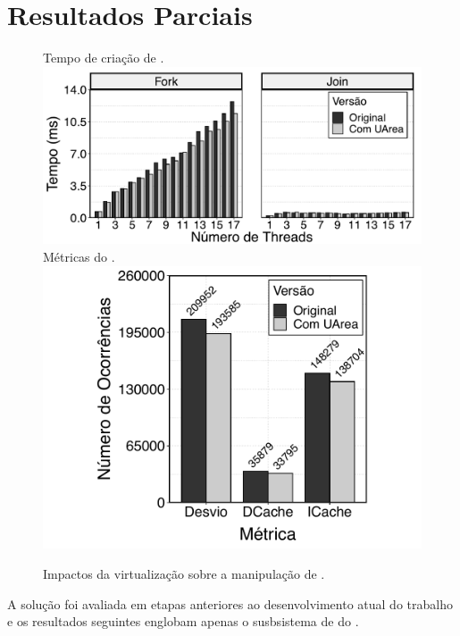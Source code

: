 \glsresetall
\chapter{Resultados Parciais}
\label{chap.results}

\begin{figure}[tb]
	\centering
                   {Tempo de criação de \threads.}
                   {\includegraphics[width=\textwidth]{content/images/fork-join-kernel-time-bars.pdf}}
	\qquad
                   {Métricas do .}
                   {\includegraphics[width=\textwidth]{content/images/fork-join-kernel-counters.pdf}}
	\caption{Impactos da virtualização sobre a manipulação de \threads.\label{fig.threads}}%
\end{figure}

A solução foi avaliada em etapas anteriores ao desenvolvimento atual do trabalho e os resultados seguintes englobam apenas o susbsistema de \threads do \nanvix. 

